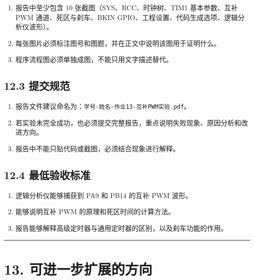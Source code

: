 \documentclass[
  chinese,
  UTF8,
  oneside,
  openany]{ctexbook}
\providecommand{\tightlist}{%
  \setlength{\itemsep}{0pt}\setlength{\parskip}{0pt}}
\begin{document}
\begin{enumerate}
\def\labelenumi{\arabic{enumi}.}
\tightlist
\item
  报告中至少包含 10 张截图（SYS、RCC、时钟树、TIM1 基本参数、互补 PWM
  通道、死区与刹车、BKIN
  GPIO、工程设置、代码生成选项、逻辑分析仪波形）。
\item
  每张图片必须标注图号和图题，并在正文中说明该图用于证明什么。
\item
  程序流程图必须单独成图，不能只用文字描述替代。
\end{enumerate}

\subsection{12.3 提交规范}\label{ux63d0ux4ea4ux89c4ux8303-8}

\begin{enumerate}
\def\labelenumi{\arabic{enumi}.}
\tightlist
\item
  报告文件建议命名为：\texttt{学号-姓名-作业13-互补PWM实验.pdf}。
\item
  若实验未完全成功，也必须提交完整报告，重点说明失败现象、原因分析和改进方向。
\item
  报告中不能只贴代码或截图，必须结合现象进行解释。
\end{enumerate}

\subsection{12.4
最低验收标准}\label{ux6700ux4f4eux9a8cux6536ux6807ux51c6-8}

\begin{enumerate}
\def\labelenumi{\arabic{enumi}.}
\tightlist
\item
  逻辑分析仪能够捕获到 PA9 和 PB14 的互补 PWM 波形。
\item
  能够说明互补 PWM 的原理和死区时间的计算方法。
\item
  报告能够解释高级定时器与通用定时器的区别，以及刹车功能的作用。
\end{enumerate}

\begin{center}\rule{0.5\linewidth}{0.5pt}\end{center}

\section{13.
可进一步扩展的方向}\label{ux53efux8fdbux4e00ux6b65ux6269ux5c55ux7684ux65b9ux5411-5}
\end{document}
